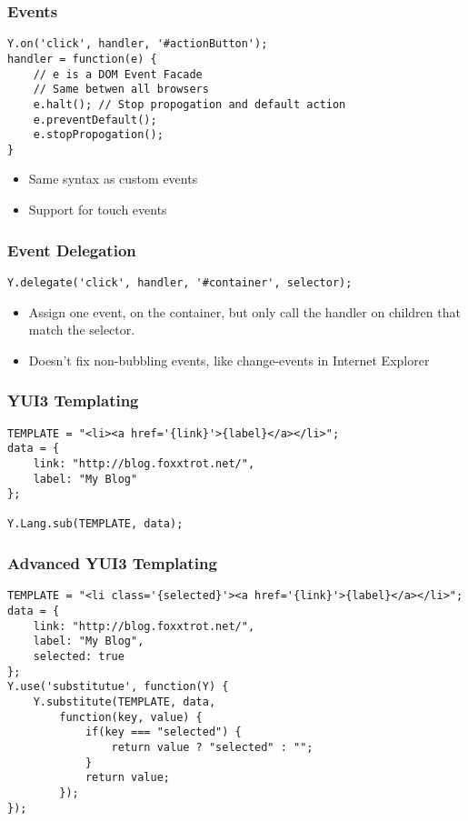 \documentclass[t]{beamer}
\begin{document}
\begin{frame}[fragile]
 \frametitle{Events}
 \begin{verbatim}
Y.on('click', handler, '#actionButton');
handler = function(e) {
    // e is a DOM Event Facade
    // Same betwen all browsers
    e.halt(); // Stop propogation and default action
    e.preventDefault();
    e.stopPropogation();
}
 \end{verbatim}
 \begin{itemize}
  \item Same syntax as custom events
  \item Support for touch events
 \end{itemize}
\end{frame}

\begin{frame}[fragile]
 \frametitle{Event Delegation}
 \begin{verbatim}
Y.delegate('click', handler, '#container', selector);
 \end{verbatim}
 \begin{itemize}
  \item Assign one event, on the container, but only call the handler on children that match the selector.
  \item<2-> Doesn't fix non-bubbling events, like change-events in Internet Explorer 
 \end{itemize}
\end{frame}

\begin{frame}[fragile]
 \frametitle{YUI3 Templating}
\begin{verbatim}
TEMPLATE = "<li><a href='{link}'>{label}</a></li>";
data = { 
    link: "http://blog.foxxtrot.net/",
    label: "My Blog"
};

Y.Lang.sub(TEMPLATE, data);
\end{verbatim}
\end{frame}

\begin{frame}[fragile]
 \frametitle{Advanced YUI3 Templating}
\begin{verbatim}
TEMPLATE = "<li class='{selected}'><a href='{link}'>{label}</a></li>";
data = { 
    link: "http://blog.foxxtrot.net/",
    label: "My Blog",
    selected: true
};
Y.use('substitutue', function(Y) {
    Y.substitute(TEMPLATE, data, 
        function(key, value) {
            if(key === "selected") {
                return value ? "selected" : "";
            }
            return value;
        });
});
\end{verbatim}
\end{frame}
\end{document}
